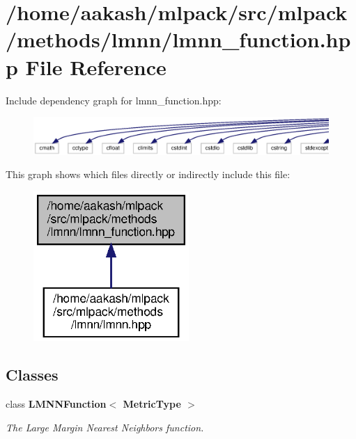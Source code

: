 \section{/home/aakash/mlpack/src/mlpack/methods/lmnn/lmnn\+\_\+function.hpp File Reference}
\label{lmnn__function_8hpp}
Include dependency graph for lmnn\+\_\+function.\+hpp\+:
\nopagebreak
\begin{figure}[H]
\begin{center}
\leavevmode
\includegraphics[width=350pt]{lmnn__function_8hpp__incl}
\end{center}
\end{figure}
This graph shows which files directly or indirectly include this file\+:
\nopagebreak
\begin{figure}[H]
\begin{center}
\leavevmode
\includegraphics[width=167pt]{lmnn__function_8hpp__dep__incl}
\end{center}
\end{figure}
\subsection*{Classes}
\begin{DoxyCompactItemize}
\item 
class \textbf{ L\+M\+N\+N\+Function$<$ Metric\+Type $>$}
\begin{DoxyCompactList}\small\item\em The Large Margin Nearest Neighbors function. \end{DoxyCompactList}\end{DoxyCompactItemize}
